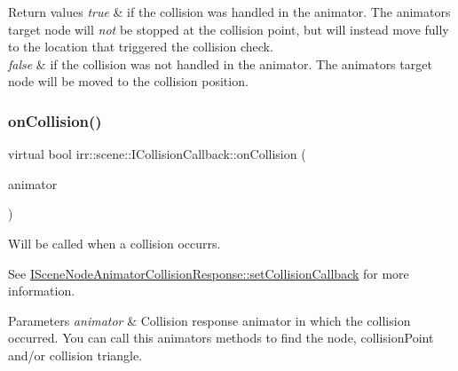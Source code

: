 \begin{DoxyRetVals}{Return values}
{\em true} & if the collision was handled in the animator. The animator\textquotesingle{}s target node will {\itshape not} be stopped at the collision point, but will instead move fully to the location that triggered the collision check. \\
\hline
{\em false} & if the collision was not handled in the animator. The animator\textquotesingle{}s target node will be moved to the collision position. \\
\hline
\end{DoxyRetVals}
\mbox{\label{classirr_1_1scene_1_1ICollisionCallback_a35791df17defc6fd301dccef1cae596a}} 
\subsubsection{\texorpdfstring{on\+Collision()}{onCollision()}\hspace{0.1cm}{\footnotesize\ttfamily [2/2]}}
{\footnotesize\ttfamily virtual bool irr\+::scene\+::\+I\+Collision\+Callback\+::on\+Collision (\begin{DoxyParamCaption}\item[{const \hyperlink{classirr_1_1scene_1_1ISceneNodeAnimatorCollisionResponse}{I\+Scene\+Node\+Animator\+Collision\+Response} \&}]{animator }\end{DoxyParamCaption})\hspace{0.3cm}{\ttfamily [pure virtual]}}



Will be called when a collision occurrs. 

See \hyperlink{classirr_1_1scene_1_1ISceneNodeAnimatorCollisionResponse_a2b97f977b446200c5dd22230aec5d275}{I\+Scene\+Node\+Animator\+Collision\+Response\+::set\+Collision\+Callback} for more information. 
\begin{DoxyParams}{Parameters}
{\em animator} & Collision response animator in which the collision occurred. You can call this animator\textquotesingle{}s methods to find the node, collision\+Point and/or collision triangle. \\
\hline
\end{DoxyParams}

